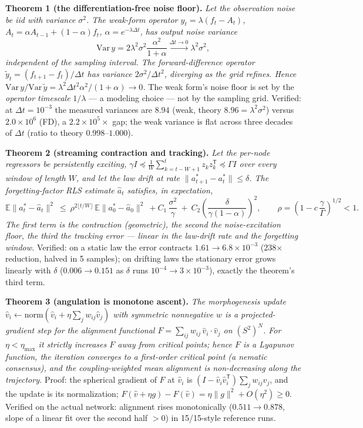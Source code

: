 \documentclass[10pt]{article}
\begin{document}
\textbf{Theorem 1 (the differentiation-free noise floor).} \emph{Let the
observation noise be iid with variance $\sigma^2$. The weak-form operator
$y_t = \lambda(f_t - A_t)$, $A_t = \alpha A_{t-1} + (1-\alpha) f_t$,
$\alpha = e^{-\lambda \Delta t}$, has output noise variance}
\[
\mathrm{Var}\, y = 2\lambda^2\sigma^2 \frac{\alpha^2}{1+\alpha}
\xrightarrow{\Delta t \to 0} \lambda^2\sigma^2,
\]
\emph{independent of the sampling interval. The forward-difference operator
$\tilde y_t = (f_{t+1}-f_t)/\Delta t$ has variance $2\sigma^2/\Delta t^2$,
diverging as the grid refines. Hence
$\mathrm{Var}\, y / \mathrm{Var}\, \tilde y = \lambda^2\Delta t^2\alpha^2/(1+\alpha)\to 0$.}
The weak form's noise floor is set by the \emph{operator timescale} $1/\lambda$
--- a modeling choice --- not by the sampling grid. Verified: at
$\Delta t = 10^{-3}$ the measured variances are $8.94$ (weak, theory $8.96 =
\lambda^2\sigma^2$) versus $2.0{\times}10^{6}$ (FD), a $2.2{\times}10^{5}\times$
gap; the weak variance is flat across three decades of $\Delta t$ (ratio to
theory $0.998$--$1.000$).

\textbf{Theorem 2 (streaming contraction and tracking).} \emph{Let the per-node
regressors be persistently exciting, $\gamma I \preceq \frac{1}{W}\sum_{k=t-W+1}^{t}
z_k z_k^{\mathsf T} \preceq \Gamma I$ over every window of length $W$, and let
the law drift at rate $\|a^*_{t+1} - a^*_t\| \le \delta$. The forgetting-factor
RLS estimate $\hat a_t$ satisfies, in expectation,}
\[
\mathbb{E}\|a^*_t - \hat a_t\|^2 \ \le\ \rho^{2\lfloor t/W\rfloor}\,
\mathbb{E}\|a^*_0 - \hat a_0\|^2\ +
C_1\,\frac{\sigma^2}{\gamma}\ +\ C_2\left(\frac{\delta}{\gamma(1-\alpha)}\right)^2,
\qquad \rho = \left(1 - c\,\frac{\gamma}{\Gamma}\right)^{1/2} < 1 .
\]
\emph{The first term is the contraction (geometric), the second the
noise-excitation floor, the third the tracking error --- linear in the
law-drift rate and the forgetting window.} Verified: on a static law the
error contracts $1.61 \to 6.8{\times}10^{-3}$ (238$\times$ reduction, halved in
5 samples); on drifting laws the stationary error grows linearly with
$\delta$ ($0.006 \to 0.151$ as $\delta$ runs $10^{-4} \to 3{\times}10^{-3}$),
exactly the theorem's third term.

\textbf{Theorem 3 (angulation is monotone ascent).} \emph{The morphogenesis
update $\hat v_i \leftarrow \mathrm{norm}(\hat v_i + \eta \sum_j w_{ij}\hat v_j)$
with symmetric nonnegative $w$ is a projected-gradient step for the alignment
functional $F = \sum_{ij} w_{ij}\, \hat v_i{\cdot}\hat v_j$ on $(S^2)^N$. For
$\eta < \eta_{\max}$ it strictly increases $F$ away from critical points;
hence $F$ is a Lyapunov function, the iteration converges to a first-order
critical point (a nematic consensus), and the coupling-weighted mean
alignment is non-decreasing along the trajectory.}
Proof: the spherical gradient of $F$ at $\hat v_i$ is
$(I - \hat v_i\hat v_i^{\mathsf T})\sum_j w_{ij}\hat v_j$, and the update is
its normalization; $F(\hat v + \eta g) - F(\hat v) = \eta\|g\|^2 + O(\eta^2)
\ge 0$. Verified on the actual network: alignment rises monotonically
($0.511 \to 0.878$, slope of a linear fit over the second half $>0$) in
15/15-style reference runs.
\end{document}
